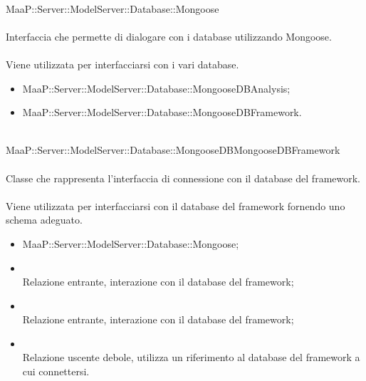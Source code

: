 	\\
	MaaP::Server::ModelServer::Database::Mongoose\\
	\\
	Interfaccia che permette di dialogare con i database utilizzando Mongoose.\\
	\\
	Viene utilizzata per interfacciarsi con i vari database.\\
	\begin{itemize}
	\item MaaP::Server::ModelServer::Database::MongooseDBAnalysis;
	\item MaaP::Server::ModelServer::Database::MongooseDBFramework.	
	\end{itemize}
		
	\\
	MaaP::Server::ModelServer::Database::MongooseDBMongooseDBFramework\\
	\\
	Classe che rappresenta l'interfaccia di connessione con il database del framework.\\
	\\
	Viene utilizzata per interfacciarsi con il database del framework fornendo uno schema adeguato.\\
	\begin{itemize}
	\item MaaP::Server::ModelServer::Database::Mongoose;
	\end{itemize}
	\begin{itemize}
	\item{}\\
	Relazione entrante, interazione con il database del framework;
	\item{}\\
	Relazione entrante, interazione con il database del framework;
	\item{}\\
	Relazione uscente debole, utilizza un riferimento al database del framework a cui connettersi.
	\end{itemize}
	
